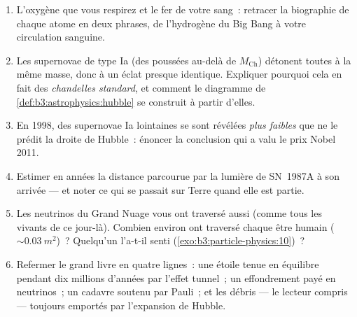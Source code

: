 \begin{problem}
\begin{enumerate}[resume]
  \item L'oxygène que vous respirez et le fer de votre sang~:
        retracer la biographie de chaque atome en deux phrases, de
        l'hydrogène du Big Bang à votre circulation sanguine.
  \item Les supernovae de type Ia (des  poussées
        au-delà de $M_{\text{Ch}}$) détonent toutes à la même masse,
        donc à un éclat presque identique. Expliquer pourquoi cela
        en fait des \emph{chandelles standard}, et comment le
        diagramme de \cref{def:b3:astrophysics:hubble} se construit
        à partir d'elles.
  \item En 1998, des supernovae Ia lointaines se sont révélées
        \emph{plus faibles} que ne le prédit la droite de Hubble~:
        énoncer la conclusion qui a valu le prix Nobel 2011.
  \item Estimer en années la distance parcourue par la lumière de
        SN~1987A à son arrivée --- et noter ce qui se passait sur
        Terre quand elle est partie.
  \item Les neutrinos du Grand Nuage vous ont traversé aussi (comme
        tous les vivants de ce jour-là). Combien environ ont
        traversé chaque être humain (${\sim}\qty{0.03}{m^2}$)~?
        Quelqu'un l'a-t-il senti
        (\cref{exo:b3:particle-physics:10})~?
  \item Refermer le grand livre en quatre lignes~: une étoile tenue
        en équilibre pendant dix millions d'années par l'effet
        tunnel~; un effondrement payé en neutrinos~; un cadavre
        soutenu par Pauli~; et les débris --- le lecteur compris ---
        toujours emportés par l'expansion de Hubble.
\end{enumerate}
\end{problem}
